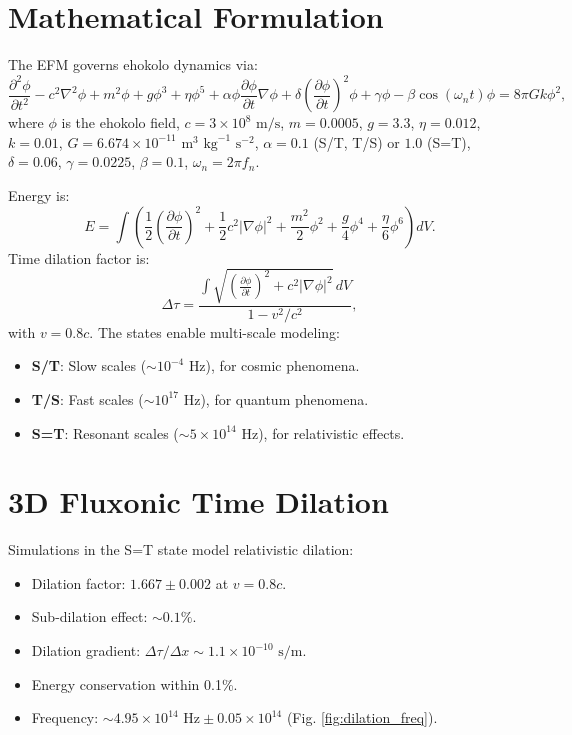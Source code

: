 \documentclass[11pt]{article}
\begin{document}
\section{Mathematical Formulation}
The EFM governs ehokolo dynamics via:
\begin{equation}
\frac{\partial^2 \phi}{\partial t^2} - c^2 \nabla^2 \phi + m^2 \phi + g \phi^3 + \eta \phi^5 + \alpha \phi \frac{\partial \phi}{\partial t} \nabla \phi + \delta \left(\frac{\partial \phi}{\partial t}\right)^2 \phi + \gamma \phi - \beta \cos(\omega_n t) \phi = 8 \pi G k \phi^2,
\end{equation}
where \(\phi\) is the ehokolo field, \(c = 3 \times 10^8 \text{ m/s}\), \(m = 0.0005\), \(g = 3.3\), \(\eta = 0.012\), \(k = 0.01\), \(G = 6.674 \times 10^{-11} \text{ m}^3 \text{ kg}^{-1} \text{ s}^{-2}\), \(\alpha = 0.1\) (S/T, T/S) or \(1.0\) (S=T), \(\delta = 0.06\), \(\gamma = 0.0225\), \(\beta = 0.1\), \(\omega_n = 2 \pi f_n\).

Energy is:
\begin{equation}
E = \int \left( \frac{1}{2} \left(\frac{\partial \phi}{\partial t}\right)^2 + \frac{1}{2} c^2 |\nabla \phi|^2 + \frac{m^2}{2} \phi^2 + \frac{g}{4} \phi^4 + \frac{\eta}{6} \phi^6 \right) dV.
\end{equation}
Time dilation factor is:
\begin{equation}
\Delta \tau = \frac{\int \sqrt{\left(\frac{\partial \phi}{\partial t}\right)^2 + c^2 |\nabla \phi|^2} \, dV}{1 - v^2 / c^2},
\end{equation}
with \( v = 0.8c \). The states enable multi-scale modeling:
\begin{itemize}
    \item \textbf{S/T}: Slow scales (\(\sim 10^{-4} \text{ Hz}\)), for cosmic phenomena.
    \item \textbf{T/S}: Fast scales (\(\sim 10^{17} \text{ Hz}\)), for quantum phenomena.
    \item \textbf{S=T}: Resonant scales (\(\sim 5 \times 10^{14} \text{ Hz}\)), for relativistic effects.
\end{itemize}

\section{3D Fluxonic Time Dilation}
Simulations in the S=T state model relativistic dilation:
\begin{itemize}
    \item Dilation factor: \( 1.667 \pm 0.002 \) at \( v = 0.8c \).
    \item Sub-dilation effect: \(\sim 0.1\%\).
    \item Dilation gradient: \(\Delta \tau / \Delta x \sim 1.1 \times 10^{-10} \text{ s/m}\).
    \item Energy conservation within 0.1\%.
    \item Frequency: \(\sim 4.95 \times 10^{14} \text{ Hz} \pm 0.05 \times 10^{14}\) (Fig. \ref{fig:dilation_freq}).
\end{itemize}
\end{document}
